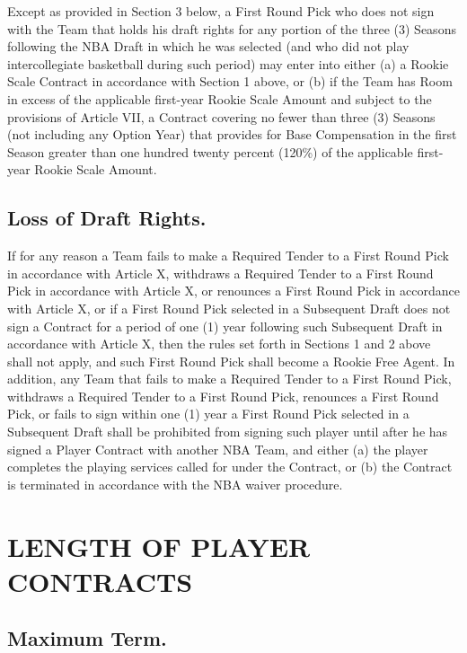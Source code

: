 \documentclass[
]{book}
\begin{document}
Except as provided in Section 3 below, a First Round Pick who does not sign with the Team that holds his draft rights for any portion of the three (3) Seasons following the NBA Draft in which he was selected (and who did not play intercollegiate basketball during such period) may enter into either (a) a Rookie Scale Contract in accordance with Section 1 above, or (b) if the Team has Room in excess of the applicable first-year Rookie Scale Amount and subject to the provisions of Article VII, a Contract covering no fewer than three (3) Seasons (not including any Option Year) that provides for Base Compensation in the first Season greater than one hundred twenty percent (120\%) of the applicable first-year Rookie Scale Amount.

\hypertarget{loss-of-draft-rights.}{%
\section{Loss of Draft Rights.}\label{loss-of-draft-rights.}}

If for any reason a Team fails to make a Required Tender to a First Round Pick in accordance with Article X, withdraws a Required Tender to a First Round Pick in accordance with Article X, or renounces a First Round Pick in accordance with Article X, or if a First Round Pick selected in a Subsequent Draft does not sign a Contract for a period of one (1) year following such Subsequent Draft in accordance with Article X, then the rules set forth in Sections 1 and 2 above shall not apply, and such First Round Pick shall become a Rookie Free Agent. In addition, any Team that fails to make a Required Tender to a First Round Pick, withdraws a Required Tender to a First Round Pick, renounces a First Round Pick, or fails to sign within one (1) year a First Round Pick selected in a Subsequent Draft shall be prohibited from signing such player until after he has signed a Player Contract with another NBA Team, and either (a) the player completes the playing services called for under the Contract, or (b) the Contract is terminated in accordance with the NBA waiver procedure.

\hypertarget{length-of-player-contracts}{%
\chapter{LENGTH OF PLAYER CONTRACTS}\label{length-of-player-contracts}}

\hypertarget{maximum-term.}{%
\section{Maximum Term.}\label{maximum-term.}}
\end{document}
